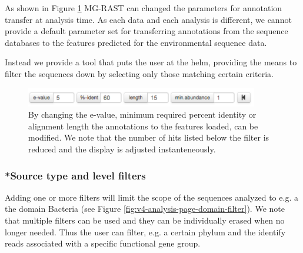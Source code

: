 \documentclass[12pt,fullpage]{report}
\begin{document}
As shown in Figure \ref{fig:v4-analysis-page-evalue-filter} MG-RAST can changed the parameters for annotation transfer at analysis time. As each data and each analysis is different, we cannot provide a default parameter set for transferring annotations from the sequence databases to the features predicted for the environmental sequence data.

Instead we provide a tool that puts the user at the helm, providing the means to filter the sequences down by selecting only those matching certain criteria.

\begin{figure}
\begin{center}
\includegraphics[width=4in]{Images/v4-analysis-page-evalue-filter.png}
\end{center}
\caption{
By changing the e-value, minimum required percent identity or
alignment length the annotations to the features loaded, can be
modified. We note that the number of hits listed below the filter is
reduced and the display is adjusted instanteneously.
}
\label{fig:v4-analysis-page-evalue-filter}
\end{figure}

\subsubsection{*Source type and level filters}

Adding one or more filters will limit the scope of the sequences analyzed to e.g. a the domain Bacteria (see Figure \ref{fig:v4-analysis-page-domain-filter}). We note that multiple filters can be used and they can be individually erased when no longer needed. Thus the user can filter, e.g. a certain phylum and the identify reads associated with a specific functional gene group.
\end{document}
